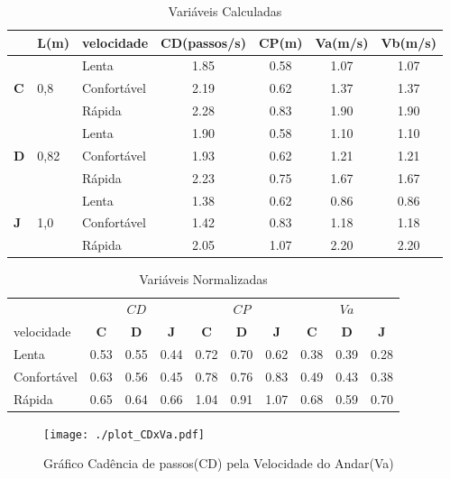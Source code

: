 \documentclass[a4paper,10pt]{article}
\begin{document}
\begin{table}
\begin{center}
\begin{tabular}{ll|lcccc}
&L(m)&velocidade & CD(passos/s) & CP(m) & Va(m/s) & Vb(m/s)\\
\hline
 & &Lenta & 1.85 & 0.58 & 1.07 & 1.07\\
\textbf{C}& 0,8&Confortável & 2.19 & 0.62 & 1.37 & 1.37\\
 & &Rápida & 2.28 & 0.83 & 1.90 & 1.90 \\
\hline
 & &Lenta & 1.90 & 0.58 & 1.10 & 1.10\\
\textbf{D}& 0,82&Confortável & 1.93 & 0.62 & 1.21 & 1.21\\
 & &Rápida & 2.23 & 0.75 & 1.67 & 1.67\\
\hline
 & &Lenta & 1.38 & 0.62 & 0.86 & 0.86\\
\textbf{J}& 1,0&Confortável & 1.42 & 0.83 & 1.18 & 1.18\\
 & &Rápida & 2.05 & 1.07 & 2.20 & 2.20\\
\end{tabular}
\end{center}
\caption{Variáveis Calculadas}
\label{tab_calculados}
\end{table}



\begin{table}
\begin{center}
\begin{tabular}{l|ccc|ccc|ccc}
& \multicolumn{3}{|c|}{$CD$} & \multicolumn{3}{|c}{$CP$} & \multicolumn{3}{|c}{$Va$}\\
velocidade & \textbf{C} & \textbf{D} & \textbf{J} & \textbf{C} & \textbf{D} & \textbf{J} & \textbf{C} & \textbf{D} & \textbf{J} \\ \hline
Lenta & 0.53 & 0.55 & 0.44 & 0.72 & 0.70 & 0.62 & 0.38 & 0.39 & 0.28\\
Confortável & 0.63 & 0.56 & 0.45 & 0.78 & 0.76 & 0.83 & 0.49 & 0.43 & 0.38\\
Rápida & 0.65 & 0.64 & 0.66 & 1.04 & 0.91 & 1.07 & 0.68 & 0.59 & 0.70
\end{tabular}
\end{center}

\caption{Variáveis Normalizadas}
\label{tab_norm}
\end{table}




\begin{figure}[h]
 \centering
 \texttt{[image: ./plot\_CDxVa.pdf]}
 \caption{Gráfico Cadência de passos(CD) pela Velocidade do Andar(Va)}
 \label{plotCDxVa}
\end{figure}
\end{document}
